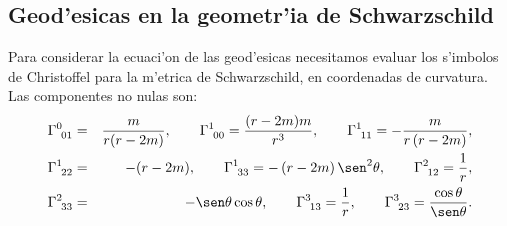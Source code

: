 %
%

\subsection{Geod'esicas en la geometr'ia de Schwarzschild}

Para considerar la ecuaci'on de las geod'esicas necesitamos evaluar los
s'imbolos de Christoffel para la m'etrica de Schwarzschild, en coordenadas de curvatura. Las componentes no nulas son:
\begin{eqnarray}
\Gamma_{\ 01}^{0} &=&\frac{m}{r(r-2m) },\qquad \Gamma_{\
00}^1=\frac{(r-2m) m}{r^3},\qquad \Gamma_{\ 11}^1=-\frac{m}{r\left(
r-2m\right) }, \nonumber \\
\Gamma_{\ 22}^1 &=&-(r-2m) ,\qquad \Gamma_{\ 33}^1=-\left(
r-2m\right) \sen ^2\theta ,\qquad \Gamma_{\ 12}^2=\frac{1}{r}, \nonumber \\
\Gamma_{\ 33}^2 &=&-\sen \theta \cos \theta ,\qquad
\Gamma_{\ 13}^3=\frac{1}{r},\qquad \Gamma_{\ 23}^3=\frac{\cos\theta}{\sen
\theta}.
\end{eqnarray}

